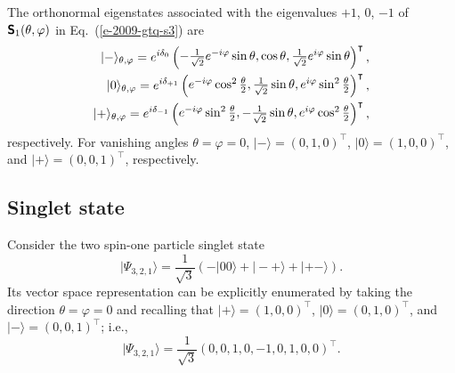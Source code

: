 \documentclass[%
  twocolumn,
 showpacs,
 showkeys,
 preprintnumbers,
 amsmath,amssymb,
 aps,
  pra,
  longbibliography,
 floatfix,
 ]{revtex4-1}
\begin{document}
The orthonormal eigenstates associated with the eigenvalues $+1$, $0$, $-1$ of
$\textsf{\textbf{S}}_1(\theta , \varphi )$ in Eq.~(\ref{e-2009-gtq-s3})
are
\begin{equation}
\label{l-soksp-ev}
\begin{split}
\vert -\rangle_{\theta ,\varphi} =e^{i\delta_0}\begin{pmatrix}
-{1\over \sqrt{2}} e^{-i\varphi} \sin \theta , \cos \theta , {1\over \sqrt{2}} e^{i\varphi}\sin \theta
\end{pmatrix}^\intercal ,\\
\vert 0\rangle_{\theta ,\varphi} =e^{i\delta_{+1}}\begin{pmatrix}
e^{-i\varphi} \cos^2{\theta \over 2}, {1\over \sqrt{2}}   \sin \theta ,e^{i\varphi}  \sin^2{\theta \over 2}
\end{pmatrix}^\intercal ,\\
\vert +\rangle_{\theta ,\varphi} =e^{i\delta_{-1}}\begin{pmatrix}
e^{-i\varphi} \sin^2{\theta \over 2}, - {1\over \sqrt{2}}     \sin \theta , e^{i\varphi}\cos^2{\theta \over 2}
\end{pmatrix}^\intercal ,
\end{split}
\end{equation}
respectively.
For vanishing angles $\theta =\varphi =0$,
$\vert -\rangle = \left( 0,1,0\right)^\intercal$,
$\vert 0\rangle = \left( 1,0,0\right)^\intercal$,  and
$\vert +\rangle = \left( 0,0,1\right)^\intercal$, respectively.



\subsection{Singlet state}

Consider the two spin-one particle singlet state
\begin{equation}
\label{2009-gtq-s1}
\vert \Psi_{3,2,1} \rangle  =  \frac{1}{\sqrt{3}}\left(-|00\rangle + |-+\rangle + |+-\rangle \right)
.
\end{equation}
Its vector space representation can be explicitly enumerated by taking the direction $\theta =\varphi =0$ and recalling that
$\vert +\rangle = \left(1,0,0\right)^\intercal$,
$\vert 0\rangle = \left(0,1,0\right)^\intercal$, and
$\vert -\rangle = \left(0,0,1\right)^\intercal$; i.e.,
\begin{equation}
\label{2009-gtq-s1ef}
\vert \Psi_{3,2,1} \rangle  =  \frac{1}{\sqrt{3}}  \left(0,0,1,0,-1,0,1,0,0 \right)^\intercal
.
\end{equation}
\end{document}

